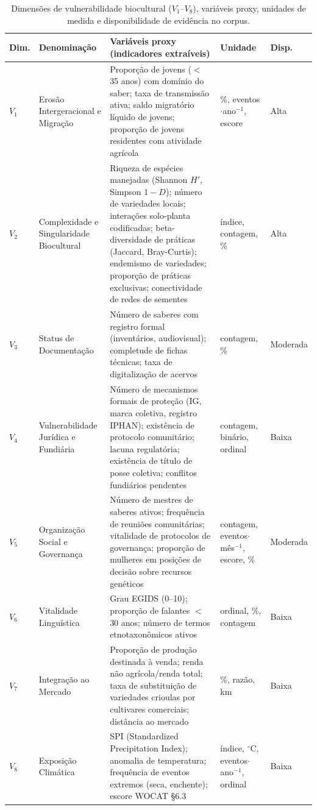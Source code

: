 \documentclass[12pt,a4paper]{article}
\begin{document}
\begin{table}[htbp]
\caption{Dimensões de vulnerabilidade biocultural ($V_1$--$V_8$), variáveis proxy, unidades de medida e disponibilidade de evidência no corpus.}
\label{tab:proxies}
\centering
\footnotesize
\begin{tabular}{p{0.8cm}p{2.5cm}p{4.2cm}p{2.2cm}p{1.5cm}}
\toprule
\textbf{Dim.} & \textbf{Denominação} & \textbf{Variáveis proxy (indicadores extraíveis)} & \textbf{Unidade} & \textbf{Disp.} \\
\midrule
$V_1$ & Erosão Intergeracional e Migração & Proporção de jovens ($<$ 35 anos) com domínio do saber; taxa de transmissão ativa; saldo migratório líquido de jovens; proporção de jovens residentes com atividade agrícola & \%, eventos$\cdot$ano$^{-1}$, escore & Alta \\
\addlinespace
$V_2$ & Complexidade e Singularidade Biocultural & Riqueza de espécies manejadas (Shannon $H'$, Simpson $1-D$); número de variedades locais; interações solo-planta codificadas; beta-diversidade de práticas (Jaccard, Bray-Curtis); endemismo de variedades; proporção de práticas exclusivas; conectividade de redes de sementes & índice, contagem, \% & Alta \\
\addlinespace
$V_3$ & Status de Documentação & Número de saberes com registro formal (inventários, audiovisual); completude de fichas técnicas; taxa de digitalização de acervos & contagem, \% & Moderada \\
\addlinespace
$V_4$ & Vulnerabilidade Jurídica e Fundiária & Número de mecanismos formais de proteção (IG, marca coletiva, registro IPHAN); existência de protocolo comunitário; lacuna regulatória; existência de título de posse coletiva; conflitos fundiários pendentes & contagem, binário, ordinal & Baixa \\
\addlinespace
$V_5$ & Organização Social e Governança & Número de mestres de saberes ativos; frequência de reuniões comunitárias; vitalidade de protocolos de governança; proporção de mulheres em posições de decisão sobre recursos genéticos & contagem, eventos$\cdot$mês$^{-1}$, escore, \% & Moderada \\
\addlinespace
$V_6$ & Vitalidade Linguística & Grau EGIDS (0--10); proporção de falantes $<$ 30 anos; número de termos etnotaxonômicos ativos & ordinal, \%, contagem & Baixa \\
\addlinespace
$V_7$ & Integração ao Mercado & Proporção de produção destinada à venda; renda não agrícola/renda total; taxa de substituição de variedades crioulas por cultivares comerciais; distância ao mercado & \%, razão, km & Baixa \\
\addlinespace
$V_8$ & Exposição Climática & SPI (Standardized Precipitation Index); anomalia de temperatura; frequência de eventos extremos (seca, enchente); escore WOCAT §6.3 & índice, $^\circ$C, eventos$\cdot$ano$^{-1}$, ordinal & Baixa \\
\bottomrule
\end{tabular}
\end{table}
\end{document}

